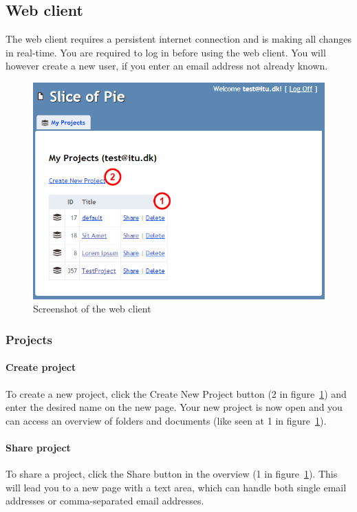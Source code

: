 \subsection{Web client}

The web client requires a persistent internet connection and is making all changes in real-time. You are required to log in before using the web client. You will however create a new user, if you enter an email address not already known.

\begin{figure}[htb]
	\centering
	\includegraphics[width=1\textwidth]{User_manual/graphics/web.png}
	\caption{Screenshot of the web client}
	\label{fig:manual-web}
\end{figure}

\subsubsection{Projects}

	\paragraph{Create project}
	To create a new project, click the Create New Project button (2 in figure~\ref{fig:manual-web}) and enter the desired name on the new page. Your new project is now open and you can access an overview of folders and documents (like seen at 1 in figure~\ref{fig:manual-web}).

	\paragraph{Share project}
	To share a project, click the Share button in the overview (1 in figure~\ref{fig:manual-web}). This will lead you to a new page with a text area, which can handle both single email addresses or comma-separated email addresses.
	
